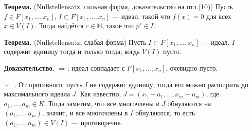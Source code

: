 \textbf{Теорема.} (Nullstellensatz, сильная форма, доказательство на отл.(10)) Пусть $f \in F[x_1, \dots, x_n]$, $I \subset F[x_1, \dots, x_n]$ --- идеал, такой что $f(x) = 0$ для всех $x \in V(I)$.
Тогда найдётся $r \in \mathbb N$, такое что $p^r \in I$.

\textbf{Теорема.} (Nullstellensatz, слабая форма) Пусть $I \subset F[x_1, \dots, x_n]$ --- идеал. $I$ содержит единицу тогда и только тогда, когда $V(I)$ пусто.

\textbf{Доказательство.} $\Rightarrow$: идеал совпадает с $F[x_1, \dots, x_n]$, очевидно пусто.

$\Leftarrow$. От противного: пусть $I$ не содержит единицу, тогда его можно расширить до максимального идеала $J$.
Как известно, $J = (x_1 - a_1, \dots, x_m - a_m)$, где $a_1, \dots, a_m \in K$.
Тогда заметим, что все многочлены в $J$ обнуляются на $(a_1, \dots, a_m)$, значит, и все многочлены в $I$ обнуляются, то есть $(a_1, \dots, a_m) \in V(I)$ --- противоречие.

\QED
